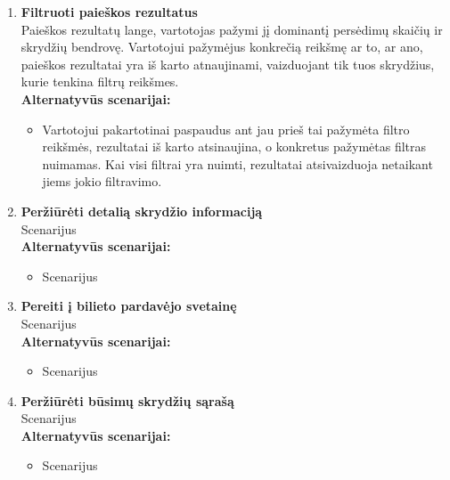 \documentclass{VUMIFPSkursinis}
\begin{document}
\begin{enumerate}[label=\textbf{U\arabic*}.]
                    \item \textbf{Filtruoti paieškos rezultatus}\\
                    Paieškos rezultatų lange, vartotojas pažymi jį dominantį persėdimų skaičių ir skrydžių bendrovę. Vartotojui pažymėjus konkrečią reikšmę ar to, ar ano, paieškos rezultatai yra iš karto atnaujinami, vaizduojant tik tuos skrydžius, kurie tenkina filtrų reikšmes.
                    \\\textbf{Alternatyvūs scenarijai:}
                    \begin{itemize}
                        \item Vartotojui pakartotinai paspaudus ant jau prieš tai pažymėta filtro reikšmės, rezultatai iš karto atsinaujina, o konkretus pažymėtas filtras nuimamas. Kai visi filtrai yra nuimti, rezultatai atsivaizduoja netaikant jiems jokio filtravimo.
                    \end{itemize}

                    \item \textbf{Peržiūrėti detalią skrydžio informaciją}\\
                    Scenarijus
                    \\\textbf{Alternatyvūs scenarijai:}
                    \begin{itemize}
                        \item Scenarijus
                    \end{itemize}

                    \item \textbf{Pereiti į bilieto pardavėjo svetainę}\\
                    Scenarijus
                    \\\textbf{Alternatyvūs scenarijai:}
                    \begin{itemize}
                        \item Scenarijus
                    \end{itemize}

                    \item \textbf{Peržiūrėti būsimų skrydžių sąrašą}\\
                    Scenarijus
                    \\\textbf{Alternatyvūs scenarijai:}
                    \begin{itemize}
                        \item Scenarijus
                    \end{itemize}
                    
                \end{enumerate}
      
\end{document}
